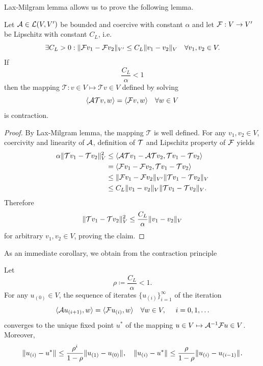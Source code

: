 {Lax-Milgram lemma allows us to prove the following lemma.
\begin{lemma}
	Let $\genop{A}\in\mathcal{L}(V,V')$ be bounded and coercive with constant $\alpha$
	and let $\genop{F}:V\to V'$ be Lipschitz with constant $C_L$, i.e. 
	$$
		\exists C_L > 0: \norm[V']{\mathcal{F}v_1 - \mathcal{F}v_2} \leq C_L \norm[V]{v_1 - v_2}\quad \forall v_1,v_2 \in V. 
	$$
	If
	$$
		\frac{C_L}{\alpha} < 1
	$$
	then the mapping $\mathcal{T} : v\in V \mapsto \mathcal{T}v\in V$ defined by solving
	$$
		\langle\genop{A}\mathcal{T}v, w\rangle = \langle \genop{F}v, w \rangle\quad \forall w \in V 
	$$
	is contraction.
\end{lemma}
\begin{proof}
	By Lax-Milgram lemma, the mapping $\mathcal{T}$ is well defined. For any $v_1,v_2\in V$, coercivity and
	linearity of $\genop{A}$, definition of $\genop{T}$ and Lipschitz property of $\genop{F}$ yields 
	$$
	\begin{aligned}
		\alpha \norm[V]{\mathcal{T}v_1 - \mathcal{T}v_2}^2 &\leq 
		\langle \genop{A}\mathcal{T}v_1 - \genop{A}\mathcal{T}v_2, \mathcal{T}v_1 - \mathcal{T}v_2 \rangle \\
		& = \langle \genop{F}v_1 - \genop{F}v_2,  \mathcal{T}v_1 - \mathcal{T}v_2 \rangle \\
		& \leq \norm[V']{\mathcal{F}v_1 - \mathcal{F}v_2} \norm[V]{\mathcal{T}v_1 - \mathcal{T}v_2}\\
		& \leq C_L \norm[V]{v_1 - v_2} \norm[V]{\mathcal{T}v_1 - \mathcal{T}v_2}.
	\end{aligned}
	$$
	Therefore
	$$
		\norm[V]{\mathcal{T}v_1 - \mathcal{T}v_2}^2 \leq \frac{C_L}{\alpha}\norm[V]{v_1 - v_2} 
	$$ 
	for arbitrary $v_1, v_2\in V$, proving the claim.
\end{proof}
As an immediate corollary, we obtain from the contraction principle
\begin{corollary}
	Let 
	$$
		\rho \coloneqq \frac{C_L}{\alpha} < 1.
	$$
	For any $u_{(0)} \in V$, the sequence of iterates $\{u_{(i)}\}_{i=1}^{\infty}$ of the iteration
	$$
		\langle\genop{A}u_{(i+1)},w\rangle = \langle \genop{F}u_{(i)}, w\rangle\quad \forall w \in V,\ \quad i = 0,1,\ldots
	$$
	converges to the unique fixed point $u^*$ of the mapping $u\in V \mapsto \genop{A}^{-1}\genop{F}u \in V$. Moreover, 
	$$
		\norm{u_{(i)} - u^*} \leq \frac{\rho^{i}}{1-\rho} \norm{u_{(1)} - u_{(0)}},\quad
		\norm{u_{(i)} - u^*} \leq \frac{\rho}{1-\rho} \norm{u_{(i)} - u_{(i-1)}}.
	$$   
\end{corollary}

}
